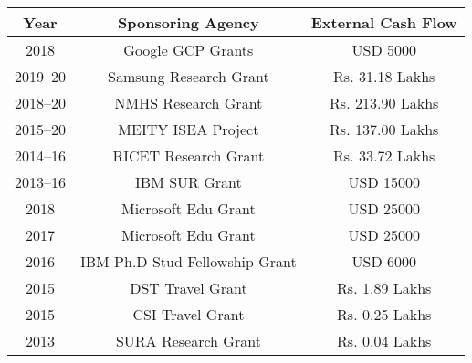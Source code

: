 	
	\begin{center}{\small
		\begin{tabular}{|c|c|c|}
			\hline \hline
			\textbf{Year} & \textbf{Sponsoring Agency} & \textbf{External Cash Flow} \\
			\hline \hline
			2018 & Google GCP Grants & USD 5000 \\  %
			2019--20 & Samsung Research Grant & Rs. 31.18 Lakhs \\  %
			
			2018--20 & NMHS Research Grant& Rs. 213.90 Lakhs \\  %
			2015--20 & MEITY ISEA Project & Rs. 137.00 Lakhs  \\ %
			2014--16 & RICET Research Grant & Rs. 33.72 Lakhs  \\ %
			2013--16 & IBM SUR Grant & USD 15000 \\ %
			2018 & Microsoft Edu Grant & USD 25000 \\ %
			2017 & Microsoft Edu Grant & USD 25000 \\ %
			2016 & IBM Ph.D Stud Fellowship Grant & USD 6000 \\ %
			2015 & DST Travel Grant & Rs. 1.89 Lakhs \\ %
			2015 & CSI Travel Grant & Rs. 0.25 Lakhs \\ %
			2013 & SURA Research Grant & Rs. 0.04 Lakhs \\
			
			\hline \hline 
	\end{tabular}}
\end{center}